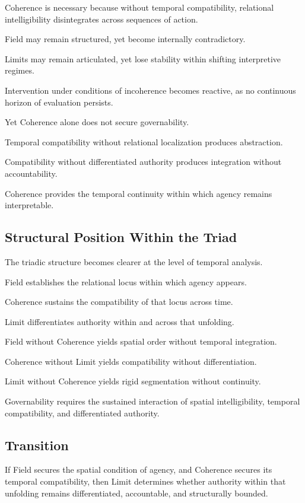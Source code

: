 \documentclass[12pt]{article}
\begin{document}
Coherence is necessary because without temporal compatibility, relational intelligibility disintegrates across sequences of action.

Field may remain structured, yet become internally contradictory.

Limits may remain articulated, yet lose stability within shifting interpretive regimes.

Intervention under conditions of incoherence becomes reactive, as no continuous horizon of evaluation persists.

Yet Coherence alone does not secure governability.

Temporal compatibility without relational localization produces abstraction.

Compatibility without differentiated authority produces integration without accountability.

Coherence provides the temporal continuity within which agency remains interpretable.

\subsection{Structural Position Within the Triad}


The triadic structure becomes clearer at the level of temporal analysis.

Field establishes the relational locus within which agency appears.

Coherence sustains the compatibility of that locus across time.

Limit differentiates authority within and across that unfolding.

Field without Coherence yields spatial order without temporal integration.

Coherence without Limit yields compatibility without differentiation.

Limit without Coherence yields rigid segmentation without continuity.

Governability requires the sustained interaction of spatial intelligibility, temporal compatibility, and differentiated authority.

\subsection{Transition}


If Field secures the spatial condition of agency, and Coherence secures its temporal compatibility, then Limit determines whether authority within that unfolding remains differentiated, accountable, and structurally bounded.
\end{document}
